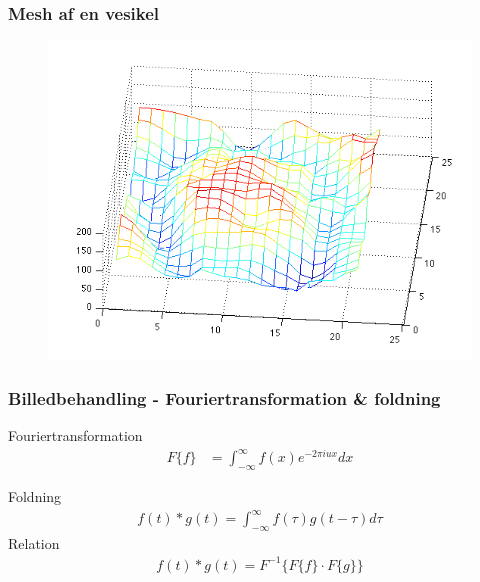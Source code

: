 \documentclass[12pt,t]{beamer}
\begin{document}
\begin{frame}
\frametitle{Mesh af en vesikel}
\begin{figure}[H]
	\centering
	\includegraphics[scale=0.4]{img/ves/mesh.png}
\end{figure}
\end{frame}

\begin{frame}
\frametitle{Billedbehandling - Fouriertransformation \& foldning}
Fouriertransformation
\begin{align*}
	F\{f\} &= \int_{-\infty}^{\infty} f(x) e^{-2 \pi i u x} dx
\end{align*}

Foldning
\begin{align*}
	f(t)*g(t)=\int_{-\infty}^{\infty}f(\tau)g(t-\tau)d\tau
\end{align*}
Relation
\begin{align*}
	f(t)*g(t)= F^{-1} \{F\{f\} \cdot  F\{g\} \}
\end{align*} 

\end{frame}
\end{document}
